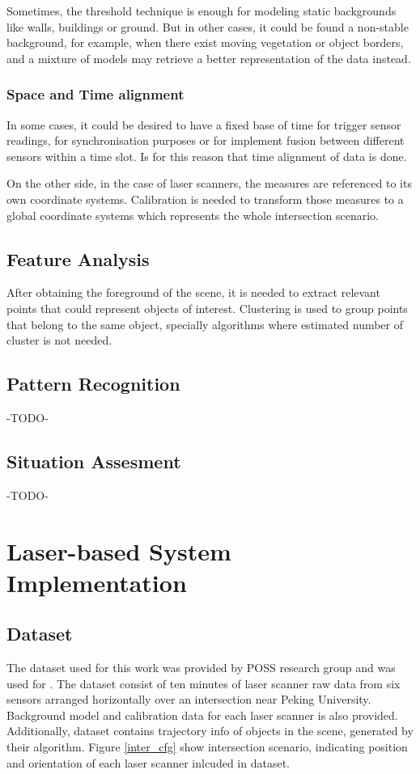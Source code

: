\documentclass[10pt,twocolumn,letterpaper]{article}
\begin{document}
Sometimes, the threshold technique is enough for modeling static backgrounds like walls, buildings or ground. But in other cases, it could be found a non-stable background, for example, when there exist moving vegetation or object borders, and a mixture of models may retrieve a better representation of the data instead.

\subsubsection{Space and Time alignment}

In some cases, it could be desired to have a fixed base of time for trigger sensor readings, for synchronisation purposes or for implement fusion between different sensors within a time slot. Is for this reason that time alignment of data is done.

On the other side, in the case of laser scanners, the measures are referenced to its own coordinate systems. Calibration is needed to transform those measures to a global coordinate systems which represents the whole intersection scenario. 

\subsection{Feature Analysis}

After obtaining the foreground of the scene, it is needed to extract relevant points that could represent objects of interest. Clustering is used to group points that belong to the same object, specially algorithms where estimated number of cluster is not needed. 


\subsection{Pattern Recognition}

-TODO-

\subsection{Situation Assesment}

-TODO-

\section{Laser-based System Implementation}

\subsection{Dataset}
 The dataset used for this work was provided by POSS research group and was used for \cite{Zhao2009}. The dataset consist of ten minutes of laser scanner raw data from six sensors arranged horizontally over an intersection near Peking University. Background model and calibration data for each laser scanner is also provided. Additionally, dataset contains trajectory info of objects in the scene, generated by their algorithm. Figure \ref{inter_cfg} show intersection scenario, indicating position and orientation of each laser scanner inlcuded in dataset.
 
\end{document}
